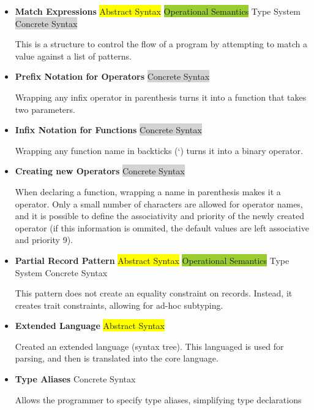 \documentclass{article}
\begin{document}
\begin{itemize}
  \item \textbf{Match Expressions} \; \; {\small\colorbox{yellow}{Abstract Syntax} \colorbox{YellowGreen}{Operational Semantics} \colorbox{ProcessBlue}{Type System} \colorbox{lightgray}{Concrete Syntax}}

      This is a structure to control the flow of a program by attempting to match a value against a list of patterns.

  \item \textbf{Prefix Notation for Operators} \; \; {\small\colorbox{lightgray}{Concrete Syntax}}

      Wrapping any infix operator in parenthesis turns it into a function that takes two parameters.

  \item \textbf{Infix Notation for Functions} \; \; {\small\colorbox{lightgray}{Concrete Syntax}}

      Wrapping any function name in backticks (\lq) turns it into a binary operator.

  \item \textbf{Creating new Operators} \; \; {\small\colorbox{lightgray}{Concrete Syntax}}

      When declaring a function, wrapping a name in parenthesis makes it a operator.
      Only a small number of characters are allowed for operator names, and it is possible to define the associativity and priority of the newly created operator (if this information is ommited, the default values are left associative and priority 9).

  \item \textbf{Partial Record Pattern} \; \; {\small\colorbox{yellow}{Abstract Syntax} \colorbox{YellowGreen}{Operational Semantics} \colorbox{ProcessBlue}{Type System}
  \colorbox{ProcessBlue}{Concrete Syntax}}

      This pattern does not create an equality constraint on records.
      Instead, it creates trait constraints, allowing for ad-hoc subtyping.

  \item \textbf{Extended Language} \; \; {\small\colorbox{yellow}{Abstract Syntax}}

      Created an extended language (syntax tree). This languaged is used for parsing, and then is translated into the core language.

  \item \textbf{Type Aliases} \; \; {\small\colorbox{ProcessBlue}{Concrete Syntax}}

      Allows the programmer to specify type aliases, simplifying type declarations

\end{itemize}
\end{document}
